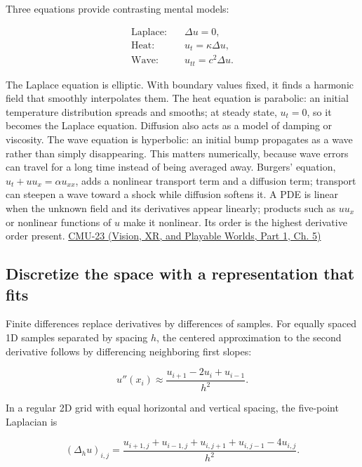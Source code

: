 Three equations provide contrasting mental models:

\[
\begin{aligned}
\text{Laplace:}\quad &\Delta u=0,\\
\text{Heat:}\quad &u_t=\kappa\Delta u,\\
\text{Wave:}\quad &u_{tt}=c^2\Delta u.
\end{aligned}
\]

The Laplace equation is elliptic. With boundary values fixed, it finds a harmonic field that smoothly interpolates them. The heat equation is parabolic: an initial temperature distribution spreads and smooths; at steady state, \(u_t=0\), so it becomes the Laplace equation. Diffusion also acts as a model of damping or viscosity. The wave equation is hyperbolic: an initial bump propagates as a wave rather than simply disappearing. This matters numerically, because wave errors can travel for a long time instead of being averaged away. Burgers' equation, \(u_t+u u_x=\alpha u_{xx}\), adds a nonlinear transport term and a diffusion term; transport can steepen a wave toward a shock while diffusion softens it. A PDE is linear when the unknown field and its derivatives appear linearly; products such as \(u u_x\) or nonlinear functions of \(u\) make it nonlinear. Its order is the highest derivative order present. \href{../07-Vision-XR-and-Playable-Worlds-P01/main.pdf\#nameddest=04-visual-computing-ii-ch036-cmu-23---physically-based-animation-and-pdes}{CMU-23 (Vision, XR, and Playable Worlds, Part 1, Ch. 5)}

\subsection{Discretize the space with a representation that fits}\label{04-visual-computing-ii-ch030-discretize-the-space-with-a-representation-that-fits}

\hypertarget{04-visual-computing-ii-ch030-discretize-the-space-with-a-representation-that-fits}{}

Finite differences replace derivatives by differences of samples. For equally spaced 1D samples separated by spacing \(h\), the centered approximation to the second derivative follows by differencing neighboring first slopes:

\[
u''(x_i)\approx\frac{u_{i+1}-2u_i+u_{i-1}}{h^2}.
\]

In a regular 2D grid with equal horizontal and vertical spacing, the five-point Laplacian is

\[
(\Delta_h u)_{i,j}=\frac{u_{i+1,j}+u_{i-1,j}+u_{i,j+1}+u_{i,j-1}-4u_{i,j}}{h^2}.
\]

